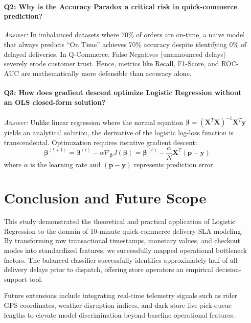 \documentclass[11pt,a4paper]{article}
\begin{document}
\paragraph{Q2: Why is the Accuracy Paradox a critical risk in quick-commerce prediction?}
\textit{Answer:} In imbalanced datasets where 70\% of orders are on-time, a naive model that always predicts ``On Time'' achieves 70\% accuracy despite identifying 0\% of delayed deliveries. In Q-Commerce, False Negatives (unannounced delays) severely erode customer trust. Hence, metrics like Recall, F1-Score, and ROC-AUC are mathematically more defensible than accuracy alone.

\paragraph{Q3: How does gradient descent optimize Logistic Regression without an OLS closed-form solution?}
\textit{Answer:} Unlike linear regression where the normal equation $\boldsymbol{\beta} = (\mathbf{X}^T\mathbf{X})^{-1}\mathbf{X}^T\mathbf{y}$ yields an analytical solution, the derivative of the logistic log-loss function is transcendental. Optimization requires iterative gradient descent:
\begin{equation}
    \boldsymbol{\beta}^{(t+1)} = \boldsymbol{\beta}^{(t)} - \alpha \nabla_{\boldsymbol{\beta}} J(\boldsymbol{\beta}) = \boldsymbol{\beta}^{(t)} - \frac{\alpha}{N} \mathbf{X}^T (\mathbf{p} - \mathbf{y})
\end{equation}
where $\alpha$ is the learning rate and $(\mathbf{p} - \mathbf{y})$ represents prediction error.

\section{Conclusion and Future Scope}
\label{sec:conclusion}
This study demonstrated the theoretical and practical application of Logistic Regression to the domain of 10-minute quick-commerce delivery SLA modeling. By transforming raw transactional timestamps, monetary values, and checkout modes into standardized features, we successfully mapped operational bottleneck factors. The balanced classifier successfully identifies approximately half of all delivery delays prior to dispatch, offering store operators an empirical decision-support tool.

Future extensions include integrating real-time telemetry signals such as rider GPS coordinates, weather disruption indices, and dark store live pick-queue lengths to elevate model discrimination beyond baseline operational features.



\end{document}
